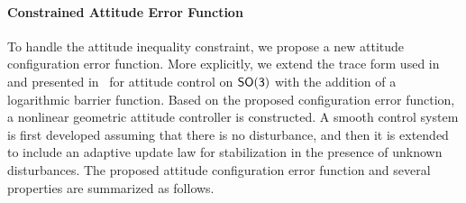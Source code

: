 \paragraph{Constrained Attitude Error Function}
To handle the attitude inequality constraint, we propose a new attitude configuration error function. 
More explicitly, we extend the trace form used in~\cite{bullo2004,LeeITCST13} and presented in~ for attitude control on \(\mathsf{SO(3)}\) with the addition of a logarithmic barrier function. 
Based on the proposed configuration error function, a nonlinear geometric attitude controller is constructed. 
A smooth control system is first developed assuming that there is  no disturbance, and then it is extended to include an adaptive update law for stabilization in the presence of unknown disturbances. 
The proposed attitude configuration error function and several properties are summarized as follows.
